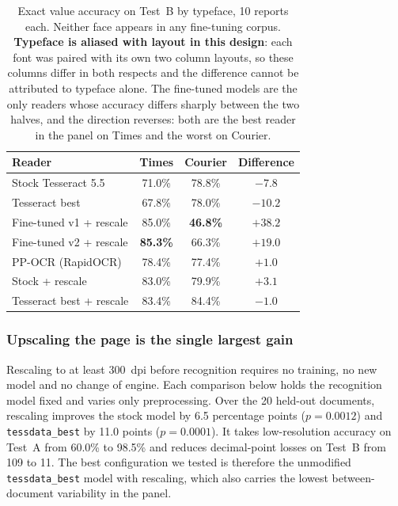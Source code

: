 \documentclass[11pt]{article}
\begin{document}
\begin{table}[t]
\centering
\caption{Exact value accuracy on Test~B by typeface, 10 reports each. Neither face appears in
any fine-tuning corpus. \textbf{Typeface is aliased with layout in this design}: each font was
paired with its own two column layouts, so these columns differ in both respects and the
difference cannot be attributed to typeface alone. The fine-tuned models are the only readers
whose accuracy differs sharply between the two halves, and the direction reverses: both are the
best reader in the panel on Times and the worst on Courier.}
\label{tab:fonts}
\small
\begin{tabular}{lccc}
\toprule
Reader & Times & Courier & Difference \\
\midrule
Stock Tesseract 5.5      & 71.0\% & 78.8\% & $-7.8$ \\
Tesseract best           & 67.8\% & 78.0\% & $-10.2$ \\
Fine-tuned v1 + rescale  & 85.0\% & \textbf{46.8\%} & $\mathbf{+38.2}$ \\
Fine-tuned v2 + rescale  & \textbf{85.3\%} & 66.3\% & $+19.0$ \\
PP-OCR (RapidOCR)        & 78.4\% & 77.4\% & $+1.0$ \\
Stock + rescale          & 83.0\% & 79.9\% & $+3.1$ \\
Tesseract best + rescale & 83.4\% & 84.4\% & $-1.0$ \\
\bottomrule
\end{tabular}
\end{table}

\subsubsection{Upscaling the page is the single largest gain}

Rescaling to at least 300~dpi before recognition requires no training, no new model and no
change of engine. Each comparison below holds the recognition model fixed and varies only
preprocessing. Over the 20 held-out documents, rescaling improves the stock model by 6.5
percentage points ($p = 0.0012$) and \texttt{tessdata\_best} by 11.0 points ($p = 0.0001$). It
takes low-resolution accuracy on Test~A from 60.0\% to 98.5\% and reduces decimal-point losses
on Test~B from 109 to 11. The best configuration we tested is therefore the unmodified
\texttt{tessdata\_best} model with rescaling, which also carries the lowest between-document
variability in the panel.
\end{document}
